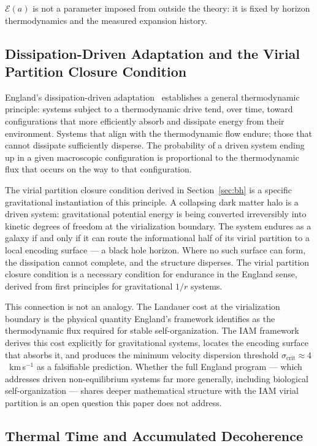 \documentclass[12pt,a4paper]{article}
\begin{document}
$\mathcal{E}(a)$ is not a parameter imposed from outside the theory: it is
fixed by horizon thermodynamics and the measured expansion history.

\subsection{Dissipation-Driven Adaptation and the Virial Partition Closure Condition}

England's dissipation-driven adaptation~\citep{England2013,England2015}
establishes a general thermodynamic principle: systems subject to a
thermodynamic drive tend, over time, toward configurations that more
efficiently absorb and dissipate energy from their environment. Systems
that align with the thermodynamic flow endure; those that cannot dissipate
sufficiently disperse. The probability of a driven system ending up in a
given macroscopic configuration is proportional to the thermodynamic flux
that occurs on the way to that configuration.

The virial partition closure condition derived in Section~\ref{sec:bh}
is a specific gravitational instantiation of this principle. A collapsing
dark matter halo is a driven system: gravitational potential energy is
being converted irreversibly into kinetic degrees of freedom at the
virialization boundary. The system endures as a galaxy if and only if
it can route the informational half of its virial partition to a local
encoding surface --- a black hole horizon. Where no such surface can
form, the dissipation cannot complete, and the structure disperses. The
virial partition closure condition is a necessary condition for endurance
in the England sense, derived from first principles for gravitational
$1/r$ systems.

This connection is not an analogy. The Landauer cost at the virialization
boundary is the physical quantity England's framework identifies as the
thermodynamic flux required for stable self-organization. The IAM
framework derives this cost explicitly for gravitational systems, locates
the encoding surface that absorbs it, and produces the minimum velocity
dispersion threshold $\sigma_\mathrm{crit} \approx 4$~km\,s$^{-1}$ as
a falsifiable prediction. Whether the full England program --- which
addresses driven non-equilibrium systems far more generally, including
biological self-organization --- shares deeper mathematical structure with
the IAM virial partition is an open question this paper does not address.

\subsection{Thermal Time and Accumulated Decoherence}
\end{document}
